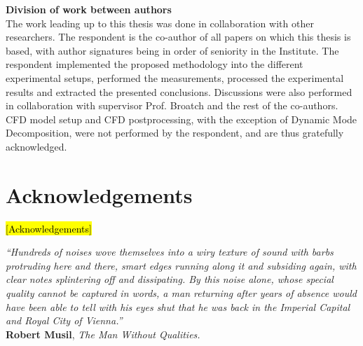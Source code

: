 \documentclass[final,twoside,11pt]{book}
\numberwithin{equation}{section}
\numberwithin{figure}{chapter}
\numberwithin{table}{chapter}
\begin{document}
\newpage

{\bfseries\sffamily\Large\noindent Division of work between authors}\\[-1mm]

The work leading up to this thesis was done in collaboration with other researchers. The respondent is the co-author of all papers on which
this thesis is based, with author signatures being in order of seniority in the Institute. The respondent implemented the proposed methodology into the different experimental setups, performed the measurements, processed the experimental results and extracted the presented conclusions. Discussions were also performed in collaboration with supervisor Prof. Broatch and the rest of the co-authors. CFD model setup and CFD postprocessing, with the exception of Dynamic Mode Decomposition, were not performed by the respondent, and are thus gratefully acknowledged.

\cleardoublepage

\chapter*{Acknowledgements}
\hl{[Acknowledgements]}
\cleardoublepage

\null\vspace{2cm}

\begin{flushright}
\begin{minipage}[t]{0.75\textwidth}



\linespread{0.97}\selectfont
{\itshape\small``Hundreds of noises wove themselves into a wiry texture of sound with barbs protruding here and there, smart edges running along it and subsiding again, with clear notes splintering off and dissipating. By this noise alone, whose special quality cannot be captured in words, a man returning after years of absence would have been able to tell with his eyes shut that he was back in the Imperial Capital and Royal City of Vienna.''}\\[-3mm]

{\cabincondensed\small\hfill \textbf{Robert Musil}, \emph{The Man Without Qualities.}}
\end{minipage}
\end{flushright}
\end{document}
